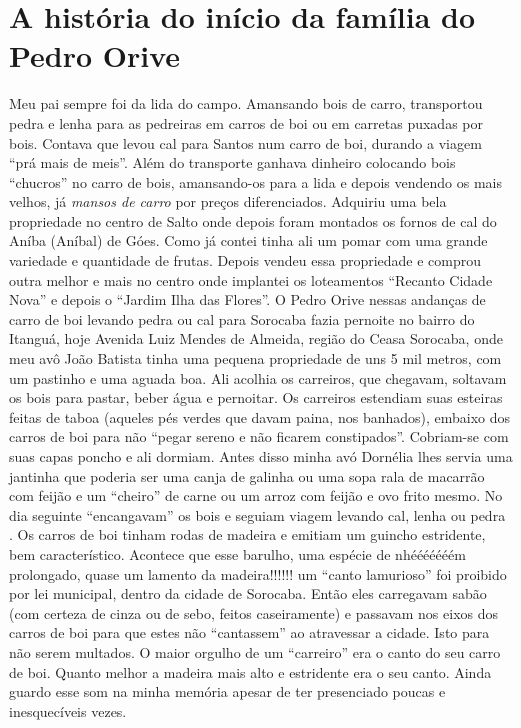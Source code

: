 \documentclass[12pt,brazil,]{book}
\begin{document}
\section{A história do início da família do Pedro
Orive}\label{a-histuxf3ria-do-inuxedcio-da-famuxedlia-do-pedro-orive}

Meu pai sempre foi da lida do campo. Amansando bois de carro,
transportou pedra e lenha para as pedreiras em carros de boi ou em
carretas puxadas por bois. Contava que levou cal para Santos num carro
de boi, durando a viagem ``prá mais de meis''. Além do transporte
ganhava dinheiro colocando bois ``chucros'' no carro de bois,
amansando-os para a lida e depois vendendo os mais velhos, já
\emph{mansos de carro} por preços diferenciados. Adquiriu uma bela
propriedade no centro de Salto onde depois foram montados os fornos de
cal do Aníba (Aníbal) de Góes. Como já contei tinha ali um pomar com uma
grande variedade e quantidade de frutas. Depois vendeu essa propriedade
e comprou outra melhor e mais no centro onde implantei os loteamentos
``Recanto Cidade Nova'' e depois o ``Jardim Ilha das Flores''. O Pedro
Orive nessas andanças de carro de boi levando pedra ou cal para Sorocaba
fazia pernoite no bairro do Itanguá, hoje Avenida Luiz Mendes de
Almeida, região do Ceasa Sorocaba, onde meu avô João Batista tinha uma
pequena propriedade de uns 5 mil metros, com um pastinho e uma aguada
boa. Ali acolhia os carreiros, que chegavam, soltavam os bois para
pastar, beber água e pernoitar. Os carreiros estendiam suas esteiras
feitas de taboa (aqueles pés verdes que davam paina, nos banhados),
embaixo dos carros de boi para não ``pegar sereno e não ficarem
constipados''. Cobriam-se com suas capas poncho e ali dormiam. Antes
disso minha avó Dornélia lhes servia uma jantinha que poderia ser uma
canja de galinha ou uma sopa rala de macarrão com feijão e um ``cheiro''
de carne ou um arroz com feijão e ovo frito mesmo. No dia seguinte
``encangavam'' os bois e seguiam viagem levando cal, lenha ou pedra . Os
carros de boi tinham rodas de madeira e emitiam um guincho estridente,
bem característico. Acontece que esse barulho, uma espécie de nhééééééém
prolongado, quase um lamento da madeira!!!!!! um ``canto lamurioso'' foi
proibido por lei municipal, dentro da cidade de Sorocaba. Então eles
carregavam sabão (com certeza de cinza ou de sebo, feitos caseiramente)
e passavam nos eixos dos carros de boi para que estes não ``cantassem''
ao atravessar a cidade. Isto para não serem multados. O maior orgulho de
um ``carreiro'' era o canto do seu carro de boi. Quanto melhor a madeira
mais alto e estridente era o seu canto. Ainda guardo esse som na minha
memória apesar de ter presenciado poucas e inesquecíveis vezes.
\end{document}
